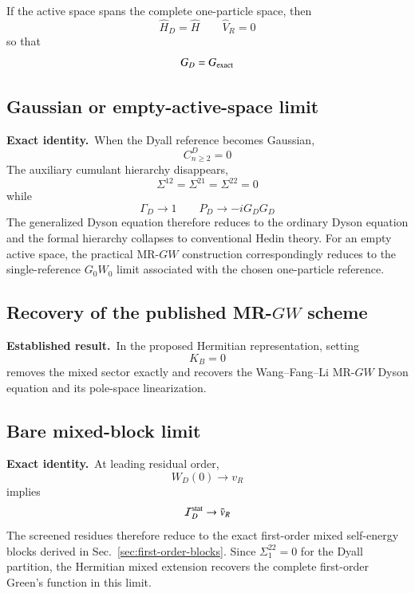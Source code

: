 \documentclass[aip,jcp,reprint,noshowkeys,superscriptaddress]{revtex4-1}
\newcommand{\Exact}{\textbf{Exact identity.}\ }
\newcommand{\Established}{\textbf{Established result.}\ }
\begin{document}
If the active space spans the complete one-particle space, then
\begin{equation}
  \hat H_D=\hat H
  \qquad
  \hat V_R=0
\end{equation}
so that
\begin{equation}
  G_D=G_{\rm exact}
\end{equation}
\subsection{Gaussian or empty-active-space limit}

\Exact When the Dyall reference becomes Gaussian,
\begin{equation}
  C_{n\ge2}^D=0
\end{equation}
The auxiliary cumulant hierarchy disappears,
\begin{equation}
  \Sigma^{12}
  =
  \Sigma^{21}
  =
  \Sigma^{22}
  =
  0
\end{equation}
while
\begin{equation}
  \Gamma_D\to1
  \qquad
  P_D\to-iG_DG_D
\end{equation}
The generalized Dyson equation therefore reduces to the ordinary Dyson
equation and the formal hierarchy collapses to conventional Hedin theory.
For an empty active space, the practical MR-$GW$ construction correspondingly
reduces to the single-reference $G_0W_0$ limit associated with the chosen
one-particle reference.
\subsection{Recovery of the published MR-$GW$ scheme}

\Established In the proposed Hermitian representation, setting
\begin{equation}
  K_B=0
\end{equation}
removes the mixed sector exactly and recovers the Wang--Fang--Li MR-$GW$
Dyson equation and its pole-space linearization.
\subsection{Bare mixed-block limit}

\Exact At leading residual order,
\begin{equation}
  W_D(0)\to v_R
\end{equation}
implies
\begin{equation}
  \mathcal I_D^{\rm stat}
  \to
  \bar v_R
\end{equation}
The screened residues therefore reduce to the exact first-order mixed
self-energy blocks derived in Sec.~\ref{sec:first-order-blocks}.  Since
$\Sigma_1^{22}=0$ for the Dyall partition, the Hermitian mixed extension
recovers the complete first-order Green's function in this limit.
\end{document}
